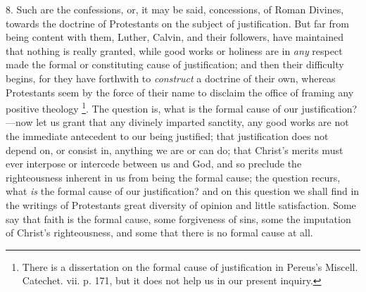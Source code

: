 8. Such are the confessions, or, it may be said, concessions, of
Roman Divines, towards the doctrine of Protestants on the subject of
justification. But far from being content with them, Luther, Calvin,
and their followers, have maintained that nothing is really granted,
while good works or holiness are in \emph{any} respect made the formal
or constituting cause of justification; and then their difficulty
begins, for they have forthwith to \emph{construct} a doctrine of
their own, whereas Protestants seem by the force of their name
to disclaim the office of framing any positive theology \footnote{There is a
dissertation on the formal cause of justification in Pereus's Miscell.
Catechet. vii. p. 171, but it does not help us in our present inquiry.}. The question is, what is the formal cause of our
justification?—now let us grant that any divinely imparted sanctity,
any good works are not the immediate antecedent to our being
justified; that justification does not depend on, or consist in, anything
we are or can do; that Christ's merits must ever interpose or
intercede between us and God, and so preclude the righteousness
inherent in us from being the formal cause; the question recurs, what \emph{is}
the formal cause of our justification? and on this question we shall
find in the writings of Protestants great diversity of opinion and
little satisfaction. Some say that faith is the formal cause, some
forgiveness of sins, some the imputation of Christ's righteousness,
and some that there is no formal cause at all.

